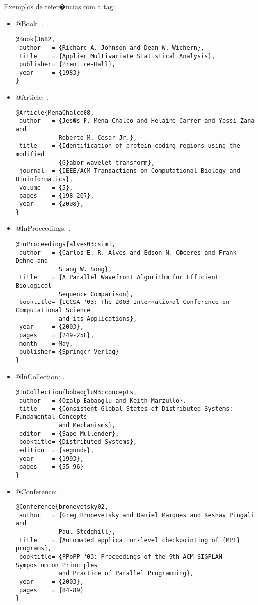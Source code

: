 Exemplos de refer�ncias com a tag:
\begin{itemize}
\item @Book: \cite{JW82}.
{\scriptsize\begin{verbatim}
@Book{JW82,
 author   = {Richard A. Johnson and Dean W. Wichern},
 title    = {Applied Multivariate Statistical Analysis},
 publisher= {Prentice-Hall},
 year     = {1983}
}
\end{verbatim}}

\item @Article: \cite{MenaChalco08}.
{\scriptsize\begin{verbatim}
@Article{MenaChalco08,
 author   = {Jes�s P. Mena-Chalco and Helaine Carrer and Yossi Zana and 
            Roberto M. Cesar-Jr.},
 title    = {Identification of protein coding regions using the modified 
            {G}abor-wavelet transform},
 journal  = {IEEE/ACM Transactions on Computational Biology and Bioinformatics},
 volume   = {5},
 pages    = {198-207},
 year     = {2008},
}
\end{verbatim}}

\item @InProceedings: \cite{alves03:simi}.
{\scriptsize\begin{verbatim}
@InProceedings{alves03:simi,
 author   = {Carlos E. R. Alves and Edson N. C�ceres and Frank Dehne and 
            Siang W. Song},
 title    = {A Parallel Wavefront Algorithm for Efficient Biological 
            Sequence Comparison},
 booktitle= {ICCSA '03: The 2003 International Conference on Computational Science
            and its Applications},
 year     = {2003},
 pages    = {249-258},
 month    = May,
 publisher= {Springer-Verlag}
}
\end{verbatim}}

\item @InCollection: \cite{bobaoglu93:concepts}.
{\scriptsize\begin{verbatim}
@InCollection{bobaoglu93:concepts,
 author   = {Ozalp Babaoglu and Keith Marzullo},
 title    = {Consistent Global States of Distributed Systems: Fundamental Concepts
            and Mechanisms},
 editor   = {Sape Mullender},
 booktitle= {Distributed Systems},
 edition  = {segunda},
 year     = {1993},
 pages    = {55-96}
}
\end{verbatim}}

\item @Conference: \cite{bronevetsky02}.
{\scriptsize\begin{verbatim}
@Conference{bronevetsky02,
 author   = {Greg Bronevetsky and Daniel Marques and Keshav Pingali and 
            Paul Stodghill},
 title    = {Automated application-level checkpointing of {MPI} programs},
 booktitle= {PPoPP '03: Proceedings of the 9th ACM SIGPLAN Symposium on Principles
            and Practice of Parallel Programming},
 year     = {2003},
 pages    = {84-89}
}
\end{verbatim}}


\end{itemize}

